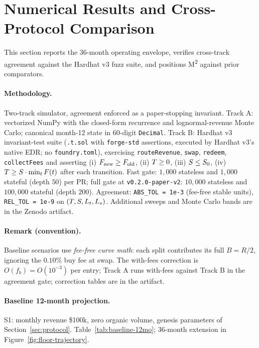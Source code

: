 \section{Numerical Results and Cross-Protocol Comparison}
\label{sec:numerical-results}

This section reports the 36-month operating envelope, verifies cross-track agreement against the Hardhat v3 fuzz suite, and positions M\textsuperscript{2} against prior comparators.

\paragraph{Methodology.} Two-track simulator, agreement enforced as a paper-stopping invariant. Track A: vectorized NumPy with the closed-form recurrence and lognormal-revenue Monte Carlo; canonical month-12 state in 60-digit \texttt{Decimal}. Track B: Hardhat v3 invariant-test suite (\texttt{.t.sol} with \texttt{forge-std} assertions, executed by Hardhat v3's native EDR; no \texttt{foundry.toml}), exercising \texttt{routeRevenue}, \texttt{swap}, \texttt{redeem}, \texttt{collectFees} and asserting (i) $F_{\text{new}} \geq F_{\text{old}}$, (ii) $T \geq 0$, (iii) $S \leq S_0$, (iv) $T \geq S \cdot \min_t F(t)$ after each transition. Fast gate: $1{,}000$ stateless and $1{,}000$ stateful (depth $50$) per PR; full gate at \texttt{v0.2.0-paper-v2}: $10{,}000$ stateless and $100{,}000$ stateful (depth $200$). Agreement: \texttt{ABS\_TOL = 1e-3} (fee-free stable units), \texttt{REL\_TOL = 1e-9} on $(T, S, L_t, L_s)$. Additional sweeps and Monte Carlo bands are in the Zenodo artifact.

\paragraph{Remark (convention).} Baseline scenarios use \emph{fee-free curve math}: each split contributes its full $B = R/2$, ignoring the $0.10\%$ buy fee at swap. The with-fees correction is $O(f_b) = O(10^{-3})$ per entry; Track A runs with-fees against Track B in the agreement gate; correction tables are in the artifact.

\paragraph{Baseline 12-month projection.} S1: monthly revenue \$100k, zero organic volume, genesis parameters of Section~\ref{sec:protocol}. Table~\ref{tab:baseline-12mo}; 36-month extension in Figure~\ref{fig:floor-trajectory}.

